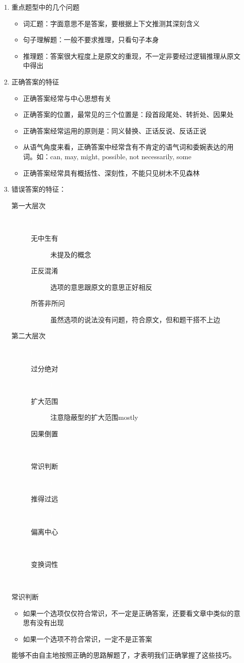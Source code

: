 \documentclass[11pt,twoside,openany,x11names,svgnames]{memoir}
\newcommand{\hei}{\CJKfamily{hei}}      %
\begin{document}
\begin{enumerate}
\item 重点题型中的几个问题
\begin{itemize}
  \item 词汇题：字面意思不是答案，要根据上下文推测其深刻含义
  \item 句子理解题：一般不要求推理，只看句子本身
  \item 推理题：答案很大程度上是原文的重现，不一定非要经过逻辑推理从原文中得出
\end{itemize}
\item 正确答案的特征
\begin{itemize}
  \item 正确答案经常与中心思想有关
  \item 正确答案的位置，最常见的三个位置是：段首段尾处、转折处、因果处
  \item 正确答案经常运用的原则是：同义替换、正话反说、反话正说
  \item 从语气角度来看，正确答案中经常含有不肯定的语气词和委婉表达的用词。如：can, may, might, possible, not necessarily, some
  \item 正确答案经常具有概括性、深刻性，不能只见树木不见森林
\end{itemize}
\item 错误答案的特征：
\begin{description}
  \item[第一大层次] \textcolor{white}{f}
  \begin{description}
  \item[无中生有] 未提及的概念
  \item[正反混淆] 选项的意思跟原文的意思正好相反
  \item[所答非所问] 虽然选项的说法没有问题，符合原文，但和题干搭不上边
\end{description}
  \item[第二大层次] \textcolor{white}{f}
  \begin{description}
  \item[过分绝对] \textcolor{white}{f}
  \item[扩大范围] 注意隐蔽型的扩大范围mostly
  \item[因果倒置] \textcolor{white}{f}
  \item[常识判断] \textcolor{white}{f}
  \item[推得过远] \textcolor{white}{f}
  \item[偏离中心] \textcolor{white}{f}
  \item[变换词性] \textcolor{white}{f}
\end{description}
\end{description}
{\hei 常识判断}
\begin{itemize}
  \item 如果一个选项仅仅符合常识，不一定是正确答案，还要看文章中类似的意思有没有出现
  \item 如果一个选项不符合常识，一定不是正答案
\end{itemize}
能够不由自主地按照正确的思路解题了，才表明我们正确掌握了这些技巧。
\end{enumerate}
\end{document}
